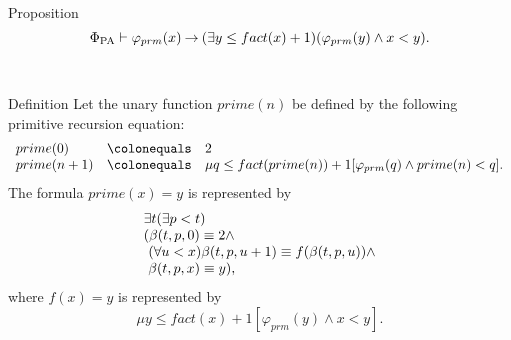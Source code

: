 \begin{theorem}{Proposition}
\[
\Phi_{\mathrm{PA}} \vdash \varphi_{prm}(x) \mathbin{\rightarrow} (\exists y \leq fact(x) + 1)(\varphi_{prm}(y) \land x < y).
\]
\end{theorem}\ \\
\begin{definition}{Definition}
Let the unary function $prime(n)$ be defined by the following primitive recursion equation:
\[
\begin{array}{lll}
prime(0) & \colonequals & 2 \cr
prime(n + 1) & \colonequals & \mu q \leq fact(prime(n)) + 1 [\varphi_{prm}(q) \land prime(n) < q].
\end{array}
\]
The formula $prime(x) \equal y$ is represented by
\[
\begin{array}{lll}
\exists t (\exists p < t) \cr
(\beta(t, p, 0) \equiv 2 \land\cr
\ (\forall u < x) \beta(t, p, u + 1) \equiv f(\beta(t, p, u)) \land\cr
\ \beta(t, p, x) \equiv y),
\end{array}
\]
where $f(x) \equal y$ is represented by
\[
\mu y \leq fact(x) + 1 [\varphi_{prm}(y) \land x < y].
\]
\end{definition}\ \\
